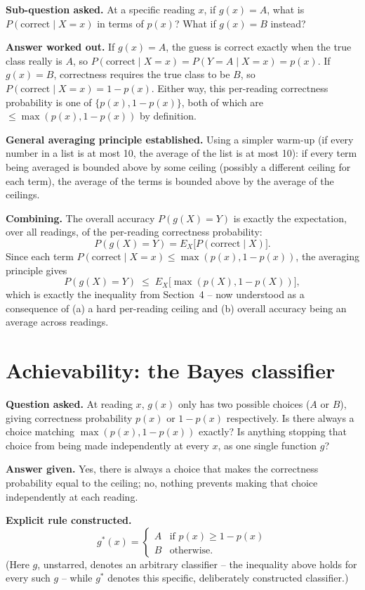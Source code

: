 \documentclass[11pt]{article}
\begin{document}
\textbf{Sub-question asked.} At a specific reading $x$, if $g(x) = A$, what
is $P(\text{correct} \mid X=x)$ in terms of $p(x)$? What if $g(x) = B$
instead?

\textbf{Answer worked out.} If $g(x)=A$, the guess is correct exactly when
the true class really is $A$, so $P(\text{correct}\mid X=x) = P(Y=A\mid
X=x) = p(x)$. If $g(x) = B$, correctness requires the true class to be $B$,
so $P(\text{correct}\mid X=x) = 1-p(x)$. Either way, this per-reading
correctness probability is one of $\{p(x), 1-p(x)\}$, both of which are
$\le \max(p(x), 1-p(x))$ by definition.

\textbf{General averaging principle established.} Using a simpler warm-up
(if every number in a list is at most 10, the average of the list is at
most 10): if every term being averaged is bounded above by some ceiling
(possibly a different ceiling for each term), the average of the terms is
bounded above by the average of the ceilings.

\textbf{Combining.} The overall accuracy $P(g(X)=Y)$ is exactly the
expectation, over all readings, of the per-reading correctness probability:
\[
  P(g(X)=Y) = E_X\big[P(\text{correct}\mid X)\big].
\]
Since each term $P(\text{correct}\mid X=x) \le \max(p(x), 1-p(x))$, the
averaging principle gives
\[
  P(g(X)=Y) \;\le\; E_X\big[\max(p(X), 1-p(X))\big],
\]
which is exactly the inequality from Section~4 -- now understood as a
consequence of (a) a hard per-reading ceiling and (b) overall accuracy being
an average across readings.

\section{Achievability: the Bayes classifier}

\textbf{Question asked.} At reading $x$, $g(x)$ only has two possible
choices ($A$ or $B$), giving correctness probability $p(x)$ or $1-p(x)$
respectively. Is there always a choice matching $\max(p(x),1-p(x))$
exactly? Is anything stopping that choice from being made independently at
every $x$, as one single function $g$?

\textbf{Answer given.} Yes, there is always a choice that makes the
correctness probability equal to the ceiling; no, nothing prevents making
that choice independently at each reading.

\textbf{Explicit rule constructed.}
\[
  g^\ast(x) = \begin{cases} A & \text{if } p(x) \ge 1-p(x) \\ B & \text{otherwise.} \end{cases}
\]
(Here $g$, unstarred, denotes an arbitrary classifier -- the inequality
above holds for every such $g$ -- while $g^\ast$ denotes this specific,
deliberately constructed classifier.)
\end{document}
